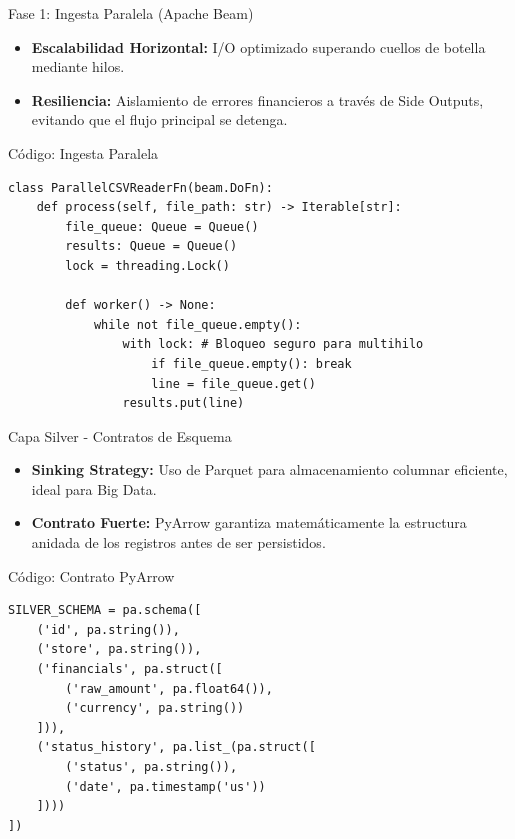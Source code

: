 \documentclass{beamer}
\begin{document}
\begin{frame}{Fase 1: Ingesta Paralela (Apache Beam)}
    \begin{itemize}
        \item \textbf{Escalabilidad Horizontal:} I/O optimizado superando cuellos de botella mediante hilos.
        \item \textbf{Resiliencia:} Aislamiento de errores financieros a través de Side Outputs, evitando que el flujo principal se detenga.
    \end{itemize}
\end{frame}

\begin{frame}[fragile]{Código: Ingesta Paralela}
\begin{Verbatim}[fontsize=\footnotesize]
class ParallelCSVReaderFn(beam.DoFn):
    def process(self, file_path: str) -> Iterable[str]:
        file_queue: Queue = Queue()
        results: Queue = Queue()
        lock = threading.Lock()

        def worker() -> None:
            while not file_queue.empty():
                with lock: # Bloqueo seguro para multihilo
                    if file_queue.empty(): break
                    line = file_queue.get()
                results.put(line)
\end{Verbatim}
\end{frame}

\begin{frame}{Capa Silver - Contratos de Esquema}
    \begin{itemize}
        \item \textbf{Sinking Strategy:} Uso de Parquet para almacenamiento columnar eficiente, ideal para Big Data.
        \item \textbf{Contrato Fuerte:} PyArrow garantiza matemáticamente la estructura anidada de los registros antes de ser persistidos.
    \end{itemize}
\end{frame}

\begin{frame}[fragile]{Código: Contrato PyArrow}
\begin{Verbatim}[fontsize=\scriptsize]
SILVER_SCHEMA = pa.schema([
    ('id', pa.string()),
    ('store', pa.string()),
    ('financials', pa.struct([
        ('raw_amount', pa.float64()),
        ('currency', pa.string())
    ])),
    ('status_history', pa.list_(pa.struct([
        ('status', pa.string()),
        ('date', pa.timestamp('us'))
    ])))
])
\end{Verbatim}
\end{frame}
\end{document}
